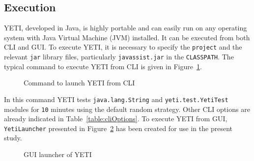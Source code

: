 \subsection{Execution}
YETI, developed in Java, is highly portable and can easily run on any operating system with Java Virtual Machine (JVM) installed. It can be executed from both CLI and GUI. To execute YETI, it is necessary to specify the \verb+project+ and the relevant \verb+jar+ library files, particularly \verb+javassist.jar+ in the \verb+CLASSPATH+. The typical command to execute YETI from CLI is given in Figure~\ref{fig:yeticommand}.
\smallskip
\begin{figure}[H]
	\centering
	\smallskip
	\caption{Command to launch YETI from CLI}
	\label{fig:yeticommand}
\end{figure}
\smallskip
In this command YETI tests \verb+java.lang.String+ and \verb+yeti.test.YetiTest+ modules for \verb+10+ minutes using the default random strategy. Other CLI options are already indicated in Table~\ref{table:cliOptions}. To execute YETI from GUI, \verb+YetiLauncher+ presented in Figure~\ref{fig:yetiLauncher} has been created for use in the present study.
\bigskip
\begin{figure}[H]
	\centering
	\smallskip
	\caption{GUI launcher of YETI}
	\label{fig:yetiLauncher}
\end{figure}


